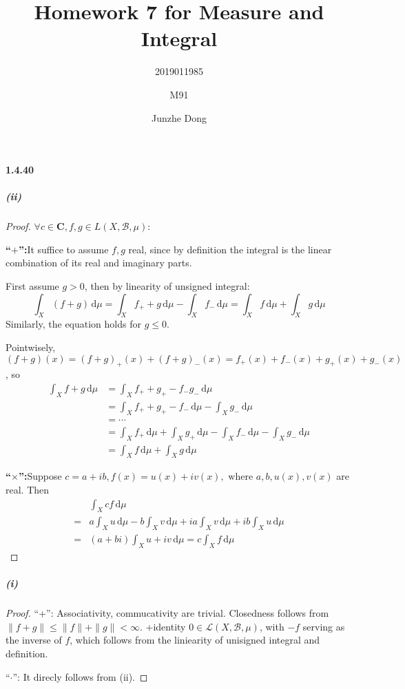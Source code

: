 \documentclass{article}
\author{2019011985\and M91\and Junzhe Dong}
\title{Homework 7 for Measure and Integral}
\begin{document}
\maketitle
\newcommand{\st}{\text{ s.t.}}
\newcommand{\dd}{\,\mathrm{d}}
\newcommand{\du}{\,\mathrm{d} \mu}
\newcommand{\re}{\mathrm{Re}\,}
\newcommand{\im}{\mathrm{Im}\,}
\newcommand{\sip}{\mathrm{Simp}}
\newcommand{\R}{\mathbf{R}^d}
\newcommand{\WLOG}{without loss of generality}
\newcommand{\aeeq}{\stackrel{\mathrm{a.e.}}{=}}
\newcommand{\B}{\mathcal{B}}
\newcommand{\F}{\mathcal{F}}
\newcommand{\Leb}{\mathcal{L}}

\DeclareRobustCommand{\rchi}{{\mathpalette\irchi\relax}}
\newcommand{\irchi}[2]{\raisebox{\depth}{$#1\chi$}} 

\paragraph{1.4.40}
\subparagraph{(ii)}
\begin{proof}
$\forall c\in\mathbf{C},f,g\in L(X,\B,\mu)$:

\textbf{``$\bm{+}$'':}It suffice to assume $f,g$ real, since by definition the integral is the linear combination of its real and imaginary parts. 

First assume $g>0$, then by linearity of unsigned integral:
\[\int_{X}(f+g)\dd\mu=\int_{X}f_++g\dd\mu-\int_{X}f_-\dd\mu=\int_X f\dd\mu+\int_X g\dd\mu\]
Similarly, the equation holds for $g\leq 0$.

Pointwisely, $(f+g)(x)=(f+g)_+(x)+(f+g)_-(x)=f_+(x)+f_-(x)+g_+(x)+g_-(x)$, so
\[\begin{aligned}
\int_X f+g\dd\mu&=\int_X f_++g_+-f_-g_-\dd\mu\\
&=\int_X f_++g_+-f_-\dd\mu-\int_X g_-\dd\mu\\
&=\cdots\\
&=\int_X f_+\dd\mu+\int_X g_+\dd\mu-\int_X f_-\dd\mu-\int_X g_-\dd\mu\\
&=\int_{X}f\dd\mu+\int_{X}g\dd\mu
\end{aligned}\]

\textbf{``$\bm{\times}$'':}Suppose $c=a+ib, f(x)=u(x)+iv(x), \text{ where } a,b,u(x),v(x)$ are real. Then 
\[\begin{aligned}
&\int_X cf\dd\mu\\=&a\int_X u\dd\mu-b\int_X v\dd\mu+ia\int_X v\dd\mu+ib\int_{X}u\dd\mu\\
=&(a+bi)\int_{X}u+iv\dd\mu=c\int_X f\dd\mu
\end{aligned}\]
\end{proof}
\subparagraph{(i)}
\begin{proof}
``+'': Associativity, commucativity are trivial. Closedness follows from $\|f+g\|\leq\|f\|+\|g\|<\infty$. +identity 0$\in \Leb(X,\B,\mu)$, with $-f$ serving as the inverse of $f$, which follows from the liniearity of unisigned integral and definition.

``$\cdot$'': It direcly follows from (ii).
\end{proof}
\end{document}
